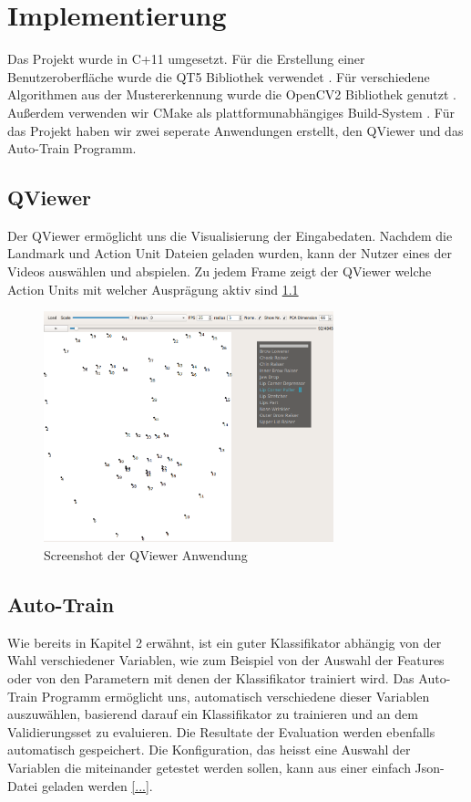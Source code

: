 \chapter{Implementierung}\label{ch:implementierung}
Das Projekt wurde in C+11 umgesetzt. Für die Erstellung einer Benutzeroberfläche wurde die QT5 Bibliothek verwendet \cite{qt5}.
Für verschiedene Algorithmen aus der Mustererkennung wurde die OpenCV2 Bibliothek genutzt \cite{opencv}. Außerdem verwenden wir CMake
als plattformunabhängiges Build-System \cite{cmake}. Für das Projekt haben wir zwei seperate Anwendungen erstellt, den QViewer und das Auto-Train
Programm.

\section{QViewer}
Der QViewer ermöglicht uns die Visualisierung der Eingabedaten. Nachdem die Landmark und Action Unit Dateien geladen wurden,
kann der Nutzer eines der Videos auswählen und abspielen. Zu jedem Frame zeigt der QViewer welche Action Units mit welcher Ausprägung aktiv sind \ref{Implementierung.QViewer}

\begin{figure}
\begin{center}
\includegraphics[width=0.75\textwidth]{qviewer.png}
\caption{Screenshot der QViewer Anwendung}
\end{center}
\label{Implementierung.QViewer}
\end{figure}


\section{Auto-Train}
Wie bereits in Kapitel 2 erwähnt, ist ein guter Klassifikator abhängig von der Wahl verschiedener Variablen, wie zum Beispiel
von der Auswahl der Features oder von den Parametern mit denen der Klassifikator trainiert wird.
Das Auto-Train Programm ermöglicht uns, automatisch verschiedene dieser Variablen auszuwählen, basierend darauf ein Klassifikator
zu trainieren und an dem Validierungsset zu evaluieren. Die Resultate der Evaluation werden ebenfalls automatisch gespeichert.
Die Konfiguration, das heisst eine Auswahl der Variablen die miteinander getestet werden sollen, kann aus einer einfach Json-Datei
geladen werden \ref{...}.


